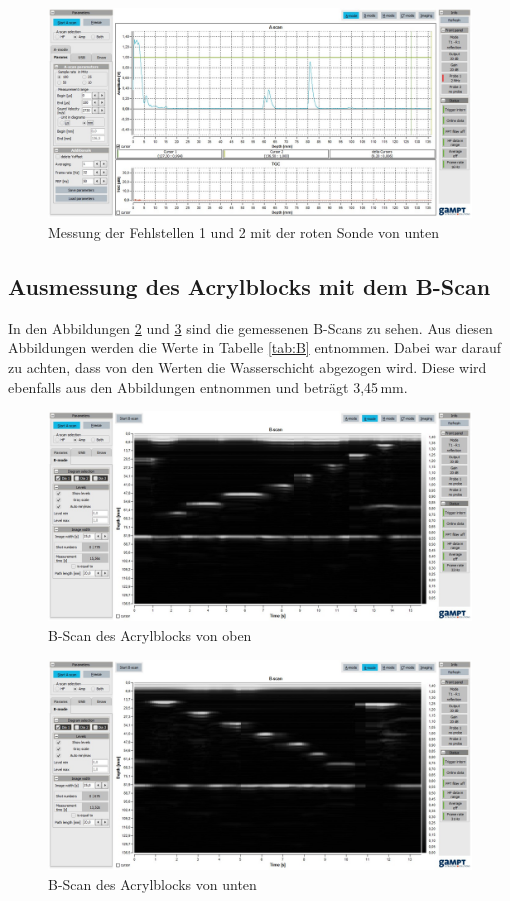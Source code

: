 \begin{figure}[H]
\centering
\includegraphics[width=\textwidth]{12rotunten.jpg}
\caption{Messung der Fehlstellen 1 und 2 mit der roten Sonde von unten}
\label{fig:runten}
\end{figure}

\subsection{Ausmessung des Acrylblocks mit dem B-Scan}
In den Abbildungen \ref{fig:boben} und \ref{fig:bunten} sind die gemessenen B-Scans zu sehen.
Aus diesen Abbildungen werden die Werte in Tabelle \ref{tab:B} entnommen.
Dabei war darauf zu achten, dass von den Werten die Wasserschicht abgezogen wird.
Diese wird ebenfalls aus den Abbildungen entnommen und beträgt 3,45\,mm.
\begin{figure}
\centering
\includegraphics[width=\textwidth]{Bscanoben.jpg}
\caption{B-Scan des Acrylblocks von oben}
\label{fig:boben}
\end{figure}

\begin{figure}
\centering
\includegraphics[width=\textwidth]{bscanunten.jpg}
\caption{B-Scan des Acrylblocks von unten}
\label{fig:bunten}
\end{figure}

